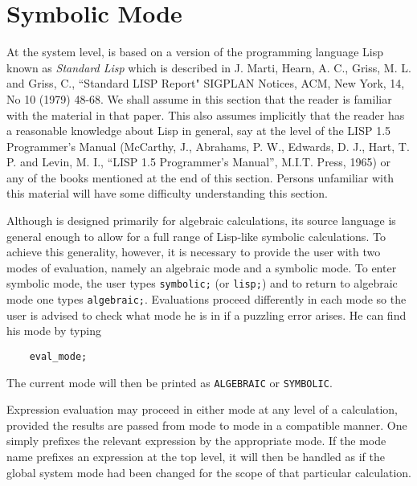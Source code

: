 \chapter{Symbolic Mode}

\label{reserved:ALGEBRAIC}
\label{reserved:SYMBOLIC}
\label{reserved:EVAL_MODE}

At the system level, {\REDUCE} is based on a version of the programming
language Lisp known as {\em Standard Lisp\/} which is described
in J. Marti, Hearn, A. C., Griss, M. L. and Griss, C., ``Standard LISP
Report" SIGPLAN Notices, ACM, New York, 14, No 10 (1979) 48-68.  We shall
assume in this section that the reader is familiar with the material in
that paper.  This also assumes implicitly that the reader has a reasonable
knowledge about Lisp in general, say at the level of the LISP 1.5
Programmer's Manual (McCarthy, J., Abrahams, P. W., Edwards, D. J., Hart,
T. P. and Levin, M. I., ``LISP 1.5 Programmer's Manual'', M.I.T.  Press,
1965) or any of the books mentioned at the end of this section.  Persons
unfamiliar with this material will have some difficulty understanding this
section.

Although {\REDUCE} is designed primarily for algebraic calculations, its
source language is general enough to allow for a full range of Lisp-like
symbolic calculations.  To achieve this generality, however, it is
necessary to provide the user with two modes of evaluation, namely an
algebraic mode and a symbolic mode. To enter symbolic mode, the user types {\tt symbolic;}
 (or {\tt lisp;}) and to return to
algebraic mode one types {\tt algebraic;}.
Evaluations proceed differently in each mode so the user is advised to
check what mode he is in if a puzzling error arises.  He can find his mode
by typing

\begin{verbatim}
	eval_mode;
\end{verbatim}
The current mode will then be printed as {\tt ALGEBRAIC} or {\tt SYMBOLIC}.

Expression evaluation may proceed in either mode at any level of a
calculation, provided the results are passed from mode to mode in a
compatible manner. One simply prefixes the relevant expression by the
appropriate mode. If the mode name prefixes an expression at the top
level, it will then be handled as if the global system mode had been
changed for the scope of that particular calculation.

